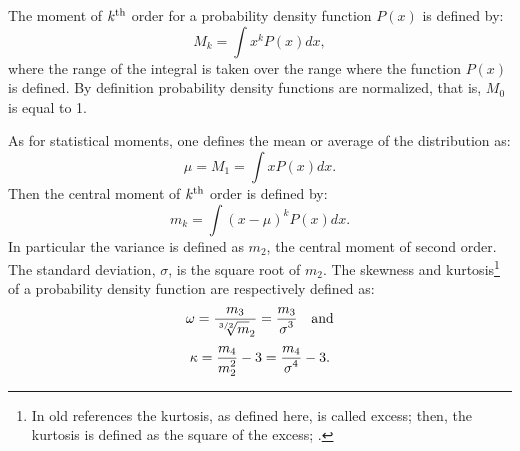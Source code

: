 \documentclass[twoside]{book}
\begin{document}
The moment of $k^{\mathop{\rm th}}$ order for a probability
density function $P\left(x\right)$ is defined by:
\begin{equation}
\label{eq:probdensity}
  M_k=\int x^k P\left(x\right) dx,
\end{equation}
where the range of the integral is taken over the range where the
function $P\left(x\right)$ is defined. By definition probability
density functions are normalized, that is, $M_0$ is equal to 1.

As for statistical moments, one defines the mean or average of the
distribution as:
\begin{equation}
  \mu=M_1=\int x P\left(x\right) dx.
\end{equation}
Then the central moment of $k^{\mathop{\rm th}}$ order is defined
by:
\begin{equation}
  m_k=\int \left(x-\mu\right)^k P\left(x\right) dx.
\end{equation}
In particular the variance is defined as $m_2$, the central moment
of second order. The standard deviation, $\sigma$, is the square
root of $m_2$. The skewness and kurtosis\footnote{In old
references the kurtosis, as defined here, is called excess; then,
the kurtosis is defined as the square of the excess;
\cite{AbrSteg} \eg.} of a probability density function are
respectively defined as:
\begin{equation}
  \omega={\displaystyle m_3 \over\displaystyle {\root 3/2 \of m_2}}
  ={\displaystyle m_3 \over\displaystyle \sigma^3}\mbox{\quad and}
\end{equation}
\begin{equation}
  \kappa={\displaystyle m_4 \over\displaystyle m_2^2}-3
  ={\displaystyle m_4 \over\displaystyle \sigma^4}-3.
\end{equation}
\end{document}
